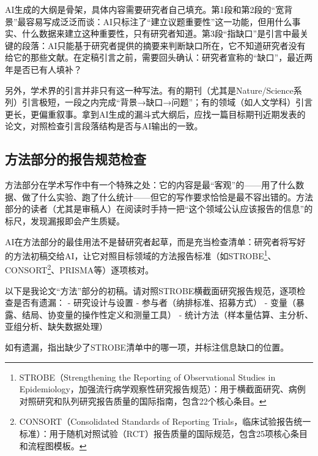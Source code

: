 \begin{critiquebox}
AI生成的大纲是骨架，具体内容需要研究者自己填充。第1段和第2段的``宽背景''最容易写成泛泛而谈：AI只标注了``建立议题重要性''这一功能，但用什么事实、什么数据来建立这种重要性，只有研究者知道。第3段``指缺口''是引言中最关键的段落：AI只能基于研究者提供的摘要来判断缺口所在，它不知道研究者没有给它的那些文献。在定稿引言之前，需要回头确认：研究者宣称的``缺口''，最近两年是否已有人填补？

另外，学术界的引言并非只有这一种写法。有的期刊（尤其是Nature/Science系列）引言极短，一段之内完成``背景→缺口→问题''；有的领域（如人文学科）引言更长，更偏重叙事。拿到AI生成的漏斗式大纲后，应找一篇目标期刊近期发表的论文，对照检查引言段落结构是否与AI输出的一致。
\end{critiquebox}

\subsection{方法部分的报告规范检查}

方法部分在学术写作中有一个特殊之处：它的内容是最``客观''的——用了什么数据、做了什么实验、跑了什么统计——但它的写作要求恰恰是最不容出错的。方法部分的读者（尤其是审稿人）在阅读时手持一把``这个领域公认应该报告的信息''的标尺，发现漏报即会产生质疑。

AI在方法部分的最佳用法不是替研究者起草，而是充当检查清单：研究者将写好的方法初稿交给AI，让它对照目标领域的方法报告标准（如STROBE\footnote{STROBE（Strengthening the Reporting of Observational Studies in Epidemiology，加强流行病学观察性研究报告规范）：用于横截面研究、病例对照研究和队列研究报告质量的国际指南，包含22个核心条目。}、CONSORT\footnote{CONSORT（Consolidated Standards of Reporting Trials，临床试验报告统一标准）：用于随机对照试验（RCT）报告质量的国际规范，包含25项核心条目和流程图模板。}、PRISMA等）逐项核对。

\begin{userbox}
以下是我论文``方法''部分的初稿。请对照STROBE横截面研究报告规范，逐项检查是否有遗漏：
- 研究设计与设置
- 参与者（纳排标准、招募方式）
- 变量（暴露、结局、协变量的操作性定义和测量工具）
- 统计方法（样本量估算、主分析、亚组分析、缺失数据处理）

如有遗漏，指出缺少了STROBE清单中的哪一项，并标注信息缺口的位置。
\end{userbox}

